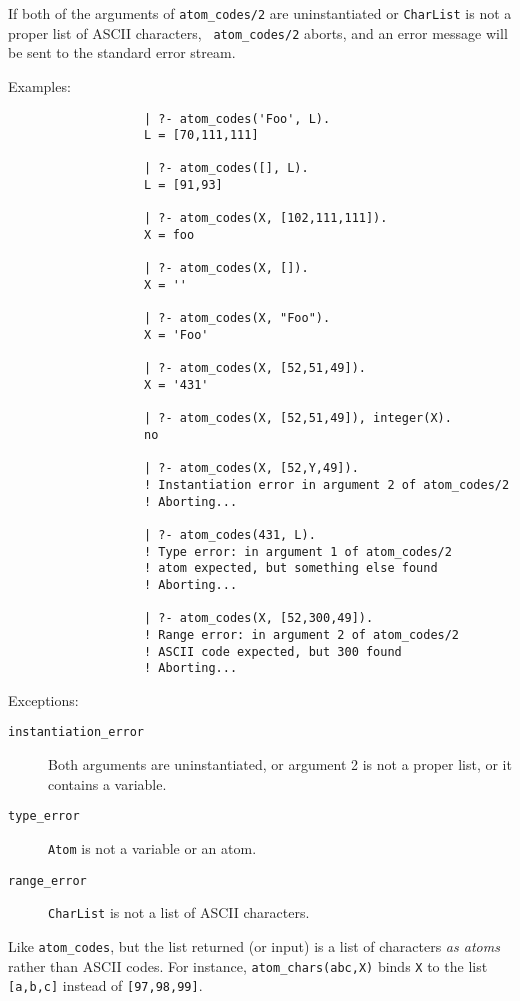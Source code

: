 \begin{description}
    If both of the arguments of {\tt atom\_codes/2} are uninstantiated or
    {\tt CharList} is not a proper list of ASCII characters, {\tt
    atom\_codes/2} aborts, and an error message will be sent to
    the standard error stream.

    Examples:
    {\footnotesize
     \begin{verbatim}
                   | ?- atom_codes('Foo', L).
                   L = [70,111,111]

                   | ?- atom_codes([], L).
                   L = [91,93]

                   | ?- atom_codes(X, [102,111,111]).
                   X = foo
 
                   | ?- atom_codes(X, []).
                   X = ''

                   | ?- atom_codes(X, "Foo").
                   X = 'Foo'

                   | ?- atom_codes(X, [52,51,49]).
                   X = '431'

                   | ?- atom_codes(X, [52,51,49]), integer(X).
                   no

                   | ?- atom_codes(X, [52,Y,49]).
                   ! Instantiation error in argument 2 of atom_codes/2
                   ! Aborting...

                   | ?- atom_codes(431, L).
                   ! Type error: in argument 1 of atom_codes/2
                   ! atom expected, but something else found
                   ! Aborting...

                   | ?- atom_codes(X, [52,300,49]).
                   ! Range error: in argument 2 of atom_codes/2
                   ! ASCII code expected, but 300 found
                   ! Aborting...
     \end{verbatim}}

    Exceptions:
    \begin{description}
    \item[{\tt instantiation\_error}]
	Both arguments are uninstantiated, or argument 2
	is not a proper list, or it contains a variable.
    \item[{\tt type\_error}]
	{\tt Atom} is not a variable or an atom.
    \item[{\tt range\_error}]
	{\tt CharList} is not a list of ASCII characters.
    \end{description}

    Like \verb|atom_codes|, but the list returned (or input) is a list of
    characters \emph{as atoms} rather than ASCII codes. For instance, 
    \verb|atom_chars(abc,X)| binds {\tt X} to the list {\tt [a,b,c]}
    instead of {\tt [97,98,99]}.


\end{description}
